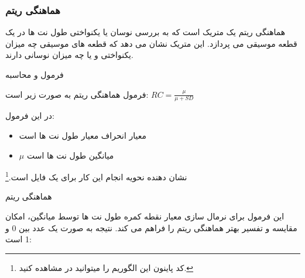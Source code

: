 \subsubsection{هماهنگی ریتم }

هماهنگی ریتم یک متریک است که به بررسی نوسان یا یکنواختی طول نت ها در یک قطعه موسیقی می پردازد. این متریک نشان می دهد که قطعه های موسیقی چه میزان یکنواختی و یا چه میزان نوسانی دارند.

فرمول و محاسبه

فرمول هماهنگی ریتم به صورت زیر است:
\begin{math}
      RC =  \frac{\mu}{\mu + SD}
\end{math}

در این فرمول:
\begin{itemize}
      \item  {} معیار انحراف معیار طول نت ها است
      \item  ${\mu}$ میانگین طول نت ها است
\end{itemize}

 نشان دهنده نحویه انجام این کار برای یک فایل  است.\footnote{\label{acualCodeRef}کد پاینون این الگوریم را میتوانید در \url{} مشاهده کنید.}

\begin{LTR}
      \begin{algorithm}
            \caption{هماهنگی ریتم}
            \setmainfont{Times New Roman}
            \label{alg:analyze_rhythm_consistency}
            \begin{algorithmic}
            \end{algorithmic}
      \end{algorithm}
\end{LTR}

این فرمول برای نرمال سازی معیار نقطه کمره طول نت ها توسط میانگین، امکان مقایسه و تفسیر بهتر هماهنگی ریتم را فراهم می کند. نتیجه به صورت یک عدد بین 0 و 1 است:

